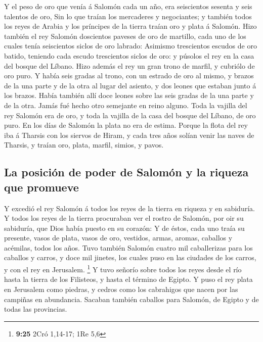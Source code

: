  Y el peso de oro que venía á Salomón cada un año, era
seiscientos sesenta y seis talentos de oro,  Sin lo que
traían los mercaderes y negociantes; y también todos los reyes de Arabia
y los príncipes de la tierra traían oro y plata á Salomón. 
Hizo también el rey Salomón doscientos paveses de oro de martillo, cada
uno de los cuales tenía seiscientos siclos de oro labrado: 
Asimismo trescientos escudos de oro batido, teniendo cada escudo
trescientos siclos de oro: y púsolos el rey en la casa del bosque del
Líbano.  Hizo además el rey un gran trono de marfil, y
cubriólo de oro puro.  Y había seis gradas al trono, con un
estrado de oro al mismo, y brazos de la una parte y de la otra al lugar
del asiento, y dos leones que estaban junto á los brazos. 
Había también allí doce leones sobre las seis gradas de la una parte y
de la otra. Jamás fué hecho otro semejante en reino alguno.
 Toda la vajilla del rey Salomón era de oro, y toda la
vajilla de la casa del bosque del Líbano, de oro puro. En los días de
Salomón la plata no era de estima.  Porque la flota del rey
iba á Tharsis con los siervos de Hiram, y cada tres años solían venir
las naves de Tharsis, y traían oro, plata, marfil, simios, y pavos.

\hypertarget{la-posiciuxf3n-de-poder-de-salomuxf3n-y-la-riqueza-que-promueve}{%
\subsection{La posición de poder de Salomón y la riqueza que
promueve}\label{la-posiciuxf3n-de-poder-de-salomuxf3n-y-la-riqueza-que-promueve}}

 Y excedió el rey Salomón á todos los reyes de la tierra en
riqueza y en sabiduría.  Y todos los reyes de la tierra
procuraban ver el rostro de Salomón, por oir su sabiduría, que Dios
había puesto en su corazón:  Y de éstos, cada uno traía su
presente, vasos de plata, vasos de oro, vestidos, armas, aromas,
caballos y acémilas, todos los años.  Tuvo también Salomón
cuatro mil caballerizas para los caballos y carros, y doce mil jinetes,
los cuales puso en las ciudades de los carros, y con el rey en
Jerusalem. \footnote{\textbf{9:25} 2Cró 1,14-17; 1Re 5,6} 
Y tuvo señorío sobre todos los reyes desde el río hasta la tierra de los
Filisteos, y hasta el término de Egipto.  Y puso el rey
plata en Jerusalem como piedras, y cedros como los cabrahigos que nacen
por las campiñas en abundancia.  Sacaban también caballos
para Salomón, de Egipto y de todas las provincias.

